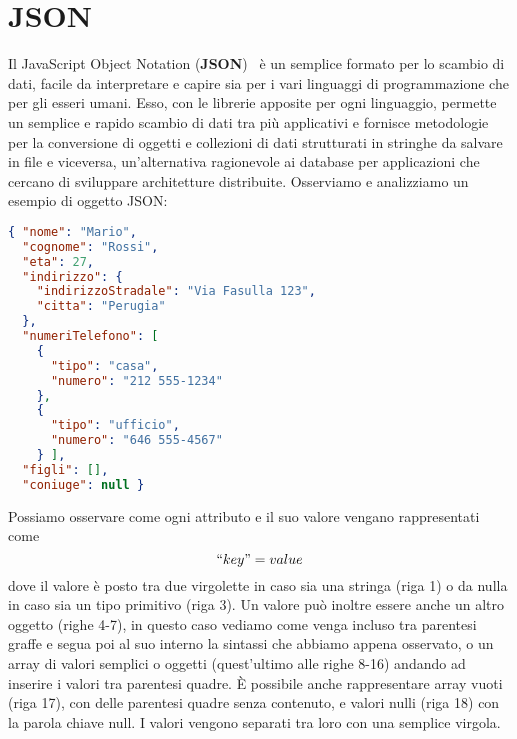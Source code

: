 \section{JSON}
\label{sub:json}
Il JavaScript Object Notation (\textbf{JSON})~\cite{json} è un semplice formato per lo scambio di dati,
facile da interpretare e capire sia per i vari linguaggi di programmazione che per gli esseri umani.
Esso, con le librerie apposite per ogni linguaggio, permette un semplice e rapido scambio
di dati tra più applicativi e fornisce metodologie per la conversione di oggetti e collezioni
di dati strutturati in stringhe da salvare in file e viceversa, un'alternativa ragionevole ai database
per applicazioni che cercano di sviluppare architetture distribuite.
Osserviamo e analizziamo un esempio di oggetto JSON:
\begin{lstlisting}[language=json,firstnumber=1]
{ "nome": "Mario",
  "cognome": "Rossi",
  "eta": 27,
  "indirizzo": {
    "indirizzoStradale": "Via Fasulla 123",
    "citta": "Perugia"
  },
  "numeriTelefono": [
    {
      "tipo": "casa",
      "numero": "212 555-1234"
    },
    {
      "tipo": "ufficio",
      "numero": "646 555-4567"
    } ],
  "figli": [],
  "coniuge": null }
\end{lstlisting} 
Possiamo osservare come ogni attributo e il suo valore vengano rappresentati come
\[``key" = value \]
dove il valore è posto tra due virgolette in caso sia una stringa (\textsf{riga 1})
o da nulla in caso sia un tipo primitivo (\textsf{riga 3}).
Un valore può inoltre essere anche un altro oggetto (\textsf{righe 4-7}), in questo caso
vediamo come venga incluso tra parentesi graffe e segua poi al suo interno la sintassi che
abbiamo appena osservato, o un array di valori semplici o oggetti (quest'ultimo alle \textsf{righe 8-16})
andando ad inserire i valori tra parentesi quadre.
È possibile anche rappresentare array vuoti (\textsf{riga 17}), con delle parentesi quadre senza
contenuto, e valori nulli (\textsf{riga 18}) con la parola chiave \textsf{null}.
I valori vengono separati tra loro con una semplice virgola.